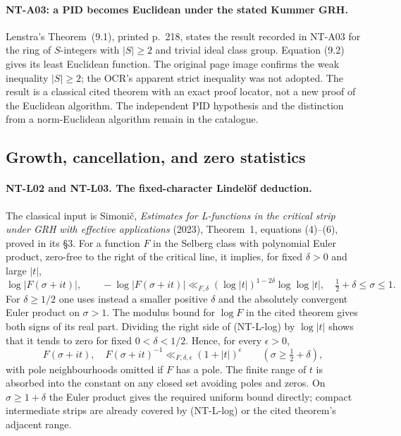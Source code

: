 \paragraph{NT-A03: a PID becomes Euclidean under the stated Kummer GRH.}
Lenstra's Theorem~(9.1), printed p.~218, states the result recorded in
NT-A03 for the ring of $S$-integers with $|S|\ge2$ and trivial ideal
class group.  Equation (9.2) gives its least Euclidean function.
The original page image confirms the weak inequality $|S|\ge2$;
the OCR's apparent strict inequality was not adopted.  The result is a
classical cited theorem with an exact proof locator, not a new proof of
the Euclidean algorithm.  The independent PID hypothesis and the
distinction from a norm-Euclidean algorithm remain in the catalogue.

\subsection{Growth, cancellation, and zero statistics}

\paragraph{NT-L02 and NT-L03. The fixed-character Lindel\"of deduction.}
The classical input is Simoni\v c, \emph{Estimates for L-functions in the
critical strip under GRH with effective applications} (2023), Theorem~1,
equations (4)--(6), proved in its \S3.  For a function $F$ in the Selberg
class with polynomial Euler product, zero-free to the right of the
critical line, it implies, for fixed $\delta>0$ and large $|t|$,
\[
 \log|F(\sigma+it)|,\qquad -\log|F(\sigma+it)|
 \ll_{F,\delta}(\log|t|)^{1-2\delta}\log\log|t|,
 \quad \tfrac12+\delta\le\sigma\le1.
\tag{NT-L-log}
\]
For $\delta\ge1/2$ one uses instead a smaller positive $\delta$ and
the absolutely convergent Euler product on $\sigma>1$.
The modulus bound for $\log F$ in the cited theorem gives both signs of
its real part.  Dividing the right side of (NT-L-log) by $\log|t|$
shows that it tends to zero for fixed $0<\delta<1/2$.  Hence, for every
$\epsilon>0$,
\[
 F(\sigma+it),\quad F(\sigma+it)^{-1}
 \ll_{F,\delta,\epsilon}(1+|t|)^\epsilon
 \qquad(\sigma\ge\tfrac12+\delta),
\tag{NT-L-right}
\]
with pole neighbourhoods omitted if $F$ has a pole.  The finite range of
$t$ is absorbed into the constant on any closed set avoiding poles and
zeros.  On $\sigma\ge1+\delta$ the Euler product gives the required
uniform bound directly; compact intermediate strips are already covered
by (NT-L-log) or the cited theorem's adjacent range.

